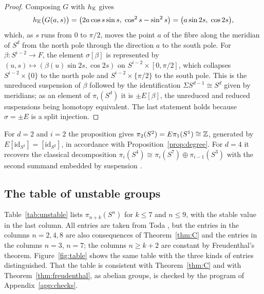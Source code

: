 \begin{proof}
Composing $G$ with $h_{\mathbb{K}}$ gives
\[
h_{\mathbb{K}}\bigl(G(a,s)\bigr)=\bigl(2a\cos s\sin s,\;\cos^2s-\sin^2s\bigr)=\bigl(a\sin2s,\;\cos2s\bigr),
\]
which, as $s$ runs from $0$ to $\pi/2$, moves the point $a$ of the fibre along the meridian of $S^d$ from the north pole through the direction $a$ to the south pole. For $\beta\colon S^{i-2}\to F$, the element $\sigma[\beta]$ is represented by $(u,s)\mapsto(\beta(u)\sin2s,\cos2s)$ on $S^{i-2}\times[0,\pi/2]$, which collapses $S^{i-2}\times\{0\}$ to the north pole and $S^{i-2}\times\{\pi/2\}$ to the south pole. This is the unreduced suspension of $\beta$ followed by the identification $\Sigma S^{d-1}\cong S^d$ given by meridians; as an element of $\pi_i(S^d)$ it is $\pm E[\beta]$, the unreduced and reduced suspensions being homotopy equivalent. The last statement holds because $\sigma=\pm E$ is a split injection.
\end{proof}

\begin{remark}
For $d=2$ and $i=2$ the proposition gives $\pi_2(S^2)=E\pi_1(S^1)\cong\mathbb{Z}$, generated by $E[\mathrm{id}_{S^1}]=[\mathrm{id}_{S^2}]$, in accordance with Proposition~\ref{prop:degree}. For $d=4$ it recovers the classical decomposition $\pi_i(S^4)\cong\pi_i(S^7)\oplus\pi_{i-1}(S^3)$ with the second summand embedded by suspension \cite[Chapter~V]{Tod62}.
\end{remark}

\subsection{The table of unstable groups}\label{sec:table}

Table~\ref{tab:unstable} lists $\pi_{n+k}(S^n)$ for $k\le7$ and $n\le9$, with the stable value in the last column. All entries are taken from Toda \cite{Tod62}, but the entries in the columns $n=2,4,8$ are also consequences of Theorem~\ref{thm:C} and the entries in the columns $n=3$, $n=7$; the columns $n\ge k+2$ are constant by Freudenthal's theorem. Figure~\ref{fig:table} shows the same table with the three kinds of entries distinguished. That the table is consistent with Theorem~\ref{thm:C} and with Theorem~\ref{thm:freudenthal}, as abelian groups, is checked by the program of Appendix~\ref{app:checks}.

